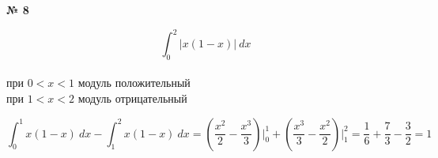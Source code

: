 \documentclass{article}
\begin{document}
\textbf{№ 8} 
\large

$$ \int_{0}^{2} \left| x(1-x) \right| \ dx $$
\\
при $ 0 < x < 1 $ модуль положительный 
\\
при $ 1 < x < 2 $ модуль отрицательный

$$ \int_{0}^{1} x(1-x) \ dx - \int_{1}^{2} x(1-x) \ dx 
= \left( \frac{x^2}{2} - \frac{x^3}{3} \right) \bigg\vert_{0}^{1} + \left( \frac{x^3}{3} - \frac{x^2}{2} \right) \bigg\vert_{1}^{2}
= \frac{1}{6} + \frac{7}{3} - \frac{3}{2}
= 1 $$
\end{document}
